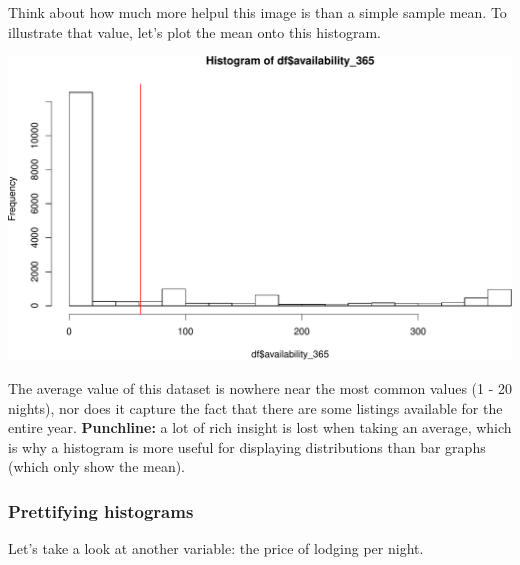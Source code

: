 \documentclass[
]{book}
\newenvironment{Shaded}{\begin{snugshade}}{\end{snugshade}}
\newcommand{\AttributeTok}[1]{\textcolor[rgb]{0.77,0.63,0.00}{#1}}
\newcommand{\FunctionTok}[1]{\textcolor[rgb]{0.00,0.00,0.00}{#1}}
\newcommand{\NormalTok}[1]{#1}
\newcommand{\SpecialCharTok}[1]{\textcolor[rgb]{0.00,0.00,0.00}{#1}}
\newcommand{\StringTok}[1]{\textcolor[rgb]{0.31,0.60,0.02}{#1}}
\begin{document}
Think about how much more helpul this image is than a simple sample mean. To illustrate that value, let's plot the mean onto this histogram.

\begin{Shaded}
\end{Shaded}

\includegraphics{figures/unnamed-chunk-212-1.pdf}

The average value of this dataset is nowhere near the most common values (1 - 20 nights), nor does it capture the fact that there are some listings available for the entire year. \textbf{Punchline:} a lot of rich insight is lost when taking an average, which is why a histogram is more useful for displaying distributions than bar graphs (which only show the mean).

\hypertarget{prettifying-histograms}{%
\subsubsection*{Prettifying histograms}\label{prettifying-histograms}}

Let's take a look at another variable: the price of lodging per night.

\begin{Shaded}
\end{Shaded}
\end{document}
